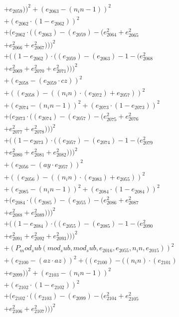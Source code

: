 \documentclass[10pt, a4paper]{article}
\begin{document}
\begin{align*}
& + e_{2059}))^{2} + (e_{2063} - (n_in - 1))^{2} \\
& + (e_{2062}  \cdot  (1 - e_{2062}))^{2} \\
& + (e_{2062}  \cdot  ((e_{2063}) - (e_{2059}) - (e_{2064}^{2} + e_{2065}^{2} \\
& + e_{2066}^{2} + e_{2067}^{2})))^{2} \\
& + ((1 - e_{2062})  \cdot  ((e_{2059}) - (e_{2063}) - 1 - (e_{2068}^{2} \\
& + e_{2069}^{2} + e_{2070}^{2} + e_{2071}^{2})))^{2} \\
& + (e_{2058} - (e_{2059}  \cdot  cz))^{2} \\
& + ((e_{2058}) - ((n_in)  \cdot  (e_{2072}) + e_{2057}))^{2} \\
& + (e_{2074} - (n_in - 1))^{2} + (e_{2073}  \cdot  (1 - e_{2073}))^{2} \\
& + (e_{2073}  \cdot  ((e_{2074}) - (e_{2057}) - (e_{2075}^{2} + e_{2076}^{2} \\
& + e_{2077}^{2} + e_{2078}^{2})))^{2} \\
& + ((1 - e_{2073})  \cdot  ((e_{2057}) - (e_{2074}) - 1 - (e_{2079}^{2} \\
& + e_{2080}^{2} + e_{2081}^{2} + e_{2082}^{2})))^{2} \\
& + (e_{2056} - (ay  \cdot  e_{2057}))^{2} \\
& + ((e_{2056}) - ((n_in)  \cdot  (e_{2083}) + e_{2055}))^{2} \\
& + (e_{2085} - (n_in - 1))^{2} + (e_{2084}  \cdot  (1 - e_{2084}))^{2} \\
& + (e_{2084}  \cdot  ((e_{2085}) - (e_{2055}) - (e_{2086}^{2} + e_{2087}^{2} \\
& + e_{2088}^{2} + e_{2089}^{2})))^{2} \\
& + ((1 - e_{2084})  \cdot  ((e_{2055}) - (e_{2085}) - 1 - (e_{2090}^{2} \\
& + e_{2091}^{2} + e_{2092}^{2} + e_{2093}^{2})))^{2} \\
& + (P_mod_sub(mod_sub, mod_sub, e_{2016}, e_{2055}, n_in, e_{2015}))^{2} \\
& + (e_{2100} - (az  \cdot  az))^{2} + ((e_{2100}) - ((n_in)  \cdot  (e_{2101}) \\
& + e_{2099}))^{2} + (e_{2103} - (n_in - 1))^{2} \\
& + (e_{2102}  \cdot  (1 - e_{2102}))^{2} \\
& + (e_{2102}  \cdot  ((e_{2103}) - (e_{2099}) - (e_{2104}^{2} + e_{2105}^{2} \\
& + e_{2106}^{2} + e_{2107}^{2})))^{2} \\

\end{align*}
\end{document}
